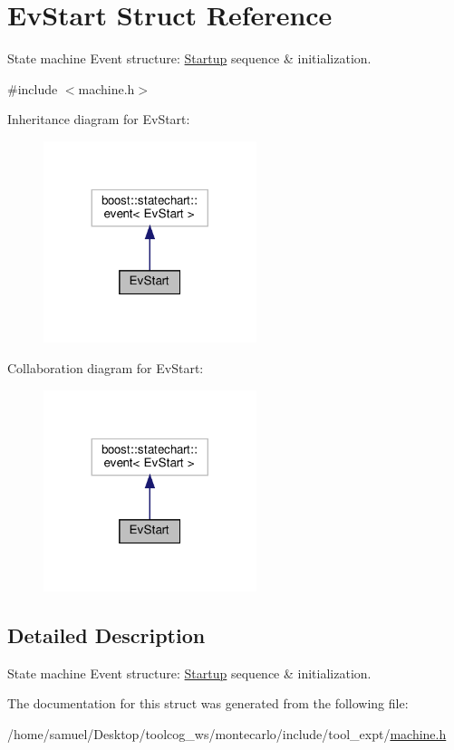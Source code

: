\hypertarget{structEvStart}{}\section{Ev\+Start Struct Reference}
\label{structEvStart}


State machine Event structure\+: \hyperlink{structStartup}{Startup} sequence \& initialization.  




{\ttfamily \#include $<$machine.\+h$>$}



Inheritance diagram for Ev\+Start\+:
\nopagebreak
\begin{figure}[H]
\begin{center}
\leavevmode
\includegraphics[width=176pt]{structEvStart__inherit__graph}
\end{center}
\end{figure}


Collaboration diagram for Ev\+Start\+:
\nopagebreak
\begin{figure}[H]
\begin{center}
\leavevmode
\includegraphics[width=176pt]{structEvStart__coll__graph}
\end{center}
\end{figure}


\subsection{Detailed Description}
State machine Event structure\+: \hyperlink{structStartup}{Startup} sequence \& initialization. 

The documentation for this struct was generated from the following file\+:\begin{DoxyCompactItemize}
\item 
/home/samuel/\+Desktop/toolcog\+\_\+ws/montecarlo/include/tool\+\_\+expt/\hyperlink{machine_8h}{machine.\+h}\end{DoxyCompactItemize}
